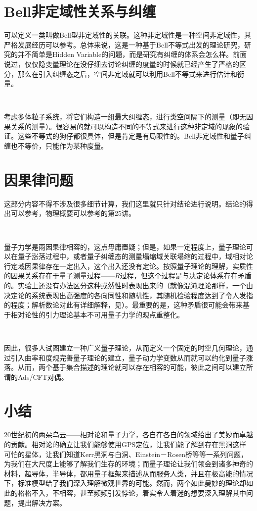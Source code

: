 \documentclass[aps,showpacs,twocolumn]{revtex4}%
\begin{document}
\section{Bell非定域性关系与纠缠}

可以定义一类叫做Bell型非定域性的关联。这种非定域性是一种空间非定域性，其严格发展经历可以参考\cite{YYPRL}。总体来说，这是一种基于Bell不等式出发的理论研究，研究的并不简单是Hidden Variable的问题，而是研究有纠缠的体系会怎么样。前面说过，仅仅隐变量理论在没仔细去讨论纠缠的度量的时候就已经产生了严格的区分，那么在引入纠缠态之后，空间非定域就可以利用Bell不等式来进行估计和衡量。

\ 

考虑多体粒子系统，将它们构造一组最大纠缠态，进行类空间隔下的测量（即无因果关系的测量）。很容易的就可以构造不同的不等式来进行这种非定域的现象的验证。这些不等式的狗仔都很具体，但是肯定是有局限性的。Bell非定域性和量子纠缠也不等价，只能作为某种度量。

\section{因果律问题}

这部分内容不得不涉及很多细节计算，我们这里就只针对结论进行说明。结论的得出可以参考\cite{RevModPhys.51.863}，物理概要可以参考\cite{ZH}的第25讲。

\ 

量子力学是雨因果律相容的，这点毋庸置疑；但是，如果一定程度上，量子理论可以在量子涨落过程中，或者量子纠缠态的测量塌缩域关联塌缩的过程中，域相对论行定域因果律存在一定出入，这个出入还没有定论。按照量子理论的理解，实质性的因果关系存在于量子测量过程——$R$过程，但这个过程是与决定论体系存在矛盾的。实验上还没有办法区分这种或然性时表现出来的（就像混沌理论那样，一个由决定论的系统表现出高强度的各向同性和随机性，其随机检验程度达到了令人发指的程度；解析数论对此有详细解释，见\cite{JXSL}）。最重要的是，这种矛盾很可能会带来基于相对论性的引力理论基本不可用量子力学的观点重整化。

\ 

因此，很多人试图建立一种广义量子理论，从而定义一个固定的时空几何理论，通过引入曲率和度规完善量子理论的建立，量子动力学变数从而就可以约化到量子涨落。从而，两个基于集合描述的理论就可以存在相容的可能，彼此之间可以建立所谓的Ads/CFT对偶。

\section{小结}

20世纪初的两朵乌云——相对论和量子力学，各自在各自的领域给出了美妙而卓越的贡献。相对论的确立让我们能够使用GPS定位，让我们能了解到存在黑洞这样可怕的星体，让我们知道Kerr黑洞与白洞、Einstein－Rosen桥等等一系列问题，为我们在大尺度上能够了解我们生存的环境；而量子理论让我们领会到诸多神奇的材料，超导体，半导体，都用量子框架来描述从而服务人类，并且在极高能的情况下，标准模型给了我们深入理解微观世界的可能。然而，两个如此曼妙的理论却如此的格格不入，不相容，甚至频频引发悖论，着实令人着迷的想要深入理解其中问题，提出解决方案。
\end{document}
